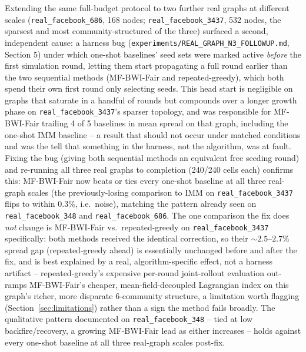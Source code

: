 \documentclass[journal]{IEEEtran}
\begin{document}
Extending the same full-budget protocol to two further real graphs at
different scales (\texttt{real\_facebook\_686}, 168 nodes;
\texttt{real\_facebook\_3437}, 532 nodes, the sparsest and most
community-structured of the three) surfaced a second, independent cause:
a harness bug (\texttt{experiments/REAL\_GRAPH\_N3\_FOLLOWUP.md}, Section
5) under which one-shot baselines' seed sets were marked active
\emph{before} the first simulation round, letting them start propagating
a full round earlier than the two sequential methods (MF-BWI-Fair and
repeated-greedy), which both spend their own first round only selecting
seeds. This head start is negligible on graphs that saturate in a handful
of rounds but compounds over a longer growth phase on
\texttt{real\_facebook\_3437}'s sparser topology, and was responsible for
MF-BWI-Fair trailing 4 of 5 baselines in mean spread on that graph,
including the one-shot IMM baseline -- a result that should not occur
under matched conditions and was the tell that something in the harness,
not the algorithm, was at fault. Fixing the bug (giving both sequential
methods an equivalent free seeding round) and re-running all three real
graphs to completion (240/240 cells each) confirms this: MF-BWI-Fair now
beats or ties every one-shot baseline at all three real-graph scales
(the previously-losing comparison to IMM on \texttt{real\_facebook\_3437}
flips to within $0.3\%$, i.e.\ noise), matching the pattern already seen
on \texttt{real\_facebook\_348} and \texttt{real\_facebook\_686}. The one
comparison the fix does \emph{not} change is MF-BWI-Fair vs.\
repeated-greedy on \texttt{real\_facebook\_3437} specifically: both
methods received the identical correction, so their $\sim\!2.5$--$2.7\%$
spread gap (repeated-greedy ahead) is essentially unchanged before and
after the fix, and is best explained by a real, algorithm-specific
effect, not a harness artifact -- repeated-greedy's expensive per-round
joint-rollout evaluation out-ramps MF-BWI-Fair's cheaper,
mean-field-decoupled Lagrangian index on this graph's richer, more
disparate 6-community structure, a limitation worth flagging
(Section~\ref{sec:limitations}) rather than a sign the method fails
broadly. The qualitative pattern documented on \texttt{real\_facebook\_348}
-- tied at low backfire/recovery, a growing MF-BWI-Fair lead as either
increases -- holds against every one-shot baseline at all three
real-graph scales post-fix.
\end{document}
